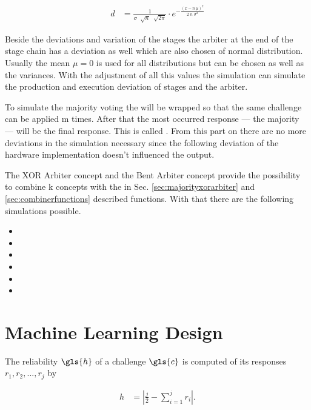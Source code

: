 \begin{align*}
d &= \frac{1}{\sigma\;\sqrt[]{n}\;\sqrt[]{2\pi}} \cdot e^{-\frac{(x-n\,\mu)^2}{2\;n\;\sigma^2}}
\end{align*}

Beside the deviations and variation of the stages the arbiter at the end of the stage chain has a deviation as well which are also chosen of normal distribution. 
Usually the mean $ \mu = 0 $ is used for all distributions but can be chosen as well as the variances.
With the adjustment of all this values the simulation can simulate the production and execution deviation of stages and the arbiter.

To simulate the majority voting the \apuf will be wrapped so that the same challenge can be applied m times.
After that the most occurred response --- the majority --- will be the final response.
This is called \mpuf.
From this part on there are no more deviations in the simulation necessary since the following deviation of the hardware implementation doesn't influenced the output.

The \ac{XOR} Arbiter concept and the Bent Arbiter concept provide the possibility to combine k concepts with the in Sec. \ref{sec:majorityxorarbiter} and \ref{sec:combinerfunctions} described functions.
With that there are the following \puf simulations possible.

\begin{itemize}
\item \apuf
\item \xpuf
\item \bpuf
\item \mpuf
\item \mxpuf
\item \mbpuf
\end{itemize}


\fi


\section{Machine Learning Design}

The reliability $\gls{h}$ of a challenge $\gls{c}$ is computed of its responses $r_1, r_2, ..., r_j$ by

\begin{align}
h &= |\frac{j}{2} - \sum_{i = 1}^{j}r_i|. \label{equ:reliability}
\end{align}

